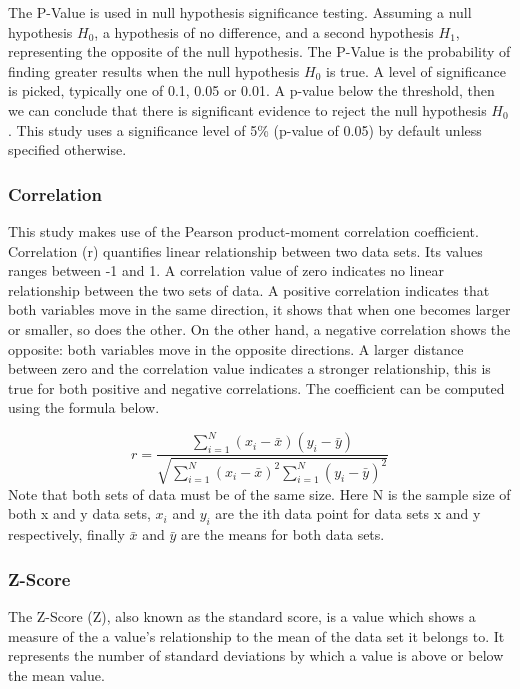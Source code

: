 The P-Value is used in null hypothesis significance testing. Assuming a null hypothesis $H_{0}$, a hypothesis of no difference, and a second hypothesis $H_{1}$, representing the opposite of the null hypothesis. The P-Value is the probability of finding greater results when the null hypothesis $H_{0}$ is true. A level of significance is picked, typically one of 0.1, 0.05 or 0.01. A p-value below the threshold, then we can conclude that there is significant evidence to reject the null hypothesis $H_{0}$. This study uses a significance level of 5\% (p-value of 0.05) by default unless specified otherwise.

\subsubsection{Correlation}

This study makes use of the Pearson product-moment correlation coefficient. Correlation (r) quantifies linear relationship between two data sets. Its values ranges between -1 and 1. A correlation value of zero indicates no linear relationship between the two sets of data. A positive correlation indicates that both variables move in the same direction, it shows that when one becomes larger or smaller, so does the other. On the other hand, a negative correlation shows the opposite: both variables move in the opposite directions. 
A larger distance between zero and the correlation value indicates a stronger relationship, this is true for both positive and negative correlations. The coefficient can be computed using the formula below.

\begin{equation}
    r = \frac{\sum_{i=1}^{N}(x_{i} - \bar{x})(y_{i} - \bar{y})}{\sqrt{\sum_{i=1}^{N}(x_{i} - \bar{x})^{2}\sum_{i=1}^{N}(y_{i} - \bar{y})^{2}}}
\end{equation}
Note that both sets of data must be of the same size. Here N is the sample size of both x and y data sets, $x_{i}$ and $y_{i}$ are the ith data point for data sets x and y respectively, finally $\bar{x}$ and $\bar{y}$ are the means for both data sets.

\subsubsection{Z-Score}

The Z-Score (Z), also known as the standard score, is a value which shows a measure of the a value's relationship to the mean of the data set it belongs to. It represents the number of standard deviations by which a value is above or below the mean value.

